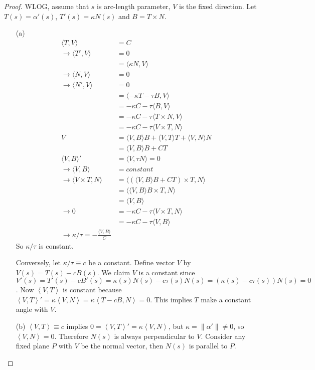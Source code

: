 \documentclass[10pt,a4paper]{article}
\begin{document}
\begin{proof}
WLOG, assume that $s$ is arc-length parameter, $V$ is the fixed direction. Let $T(s)=\alpha'(s)$, $T'(s)=\kappa N(s)$ and $B=T\times N$.
\begin{enumerate}
\item[]
\item[(a)]
\begin{align*}
\langle T,V\rangle&=C\\
\rightarrow \langle T',V\rangle&=0\\
&=\langle\kappa N,V\rangle\\
\rightarrow \langle N,V\rangle&=0\\
\rightarrow \langle N',V\rangle&=0\\
&=\langle-\kappa T-\tau B,V\rangle\\
&=-\kappa C-\tau \langle B,V\rangle\\
&=-\kappa C-\tau \langle T\times N,V\rangle\\
&=-\kappa C-\tau \langle V\times T,N\rangle\\
V&=\langle V,B\rangle B+\langle V,T\rangle T+\langle V,N\rangle N\\
&=\langle V,B\rangle B+C T\\
\langle V,B\rangle'&=\langle V,\tau N\rangle=0\\
\rightarrow \langle V,B\rangle&=constant\\
\rightarrow \langle V\times T,N\rangle&=\langle \left(\langle V,B\rangle B+C T\right)\times T,N\rangle\\
&=\langle \langle V,B\rangle B\times T,N\rangle\\
&=\langle V,B\rangle\\
\rightarrow 0&=-\kappa C-\tau \langle V\times T,N\rangle\\
&=-\kappa C-\tau\langle V,B\rangle\\
\rightarrow \kappa/\tau=-\frac{\langle V,B\rangle}{C}
\end{align*}
So $\kappa/\tau$ is constant.

Conversely, let $\kappa/\tau\equiv c$ be a constant. Define vector $V$ by $V(s) = T(s)-cB(s)$. We claim $V$ is a constant since $V'(s)=T'(s)-cB'(s)=\kappa(s) N(s) - c\tau(s) N(s) = (\kappa(s)-c\tau(s))N(s)=0$. Now $\left\langle V, T\right\rangle$ is constant because $\left\langle V, T\right\rangle'=\kappa\left\langle V,N\right\rangle = \kappa\left\langle T-cB, N\right\rangle = 0$. This implies $T$ make a constant angle with $V$.
\item[(b)]
$\left\langle V, T\right\rangle \equiv c$ implies $0=\left\langle V, T\right\rangle' = \kappa\left\langle V, N\right\rangle$, but $\kappa = \|\alpha'\|\ne 0$, so $\left\langle V, N\right\rangle=0$. Therefore $N(s)$ is always perpendicular to $V$. Consider any fixed plane $P$ with $V$ be the normal vector, then $N(s)$ is parallel to $P$.


\end{enumerate}
\end{proof}
\end{document}
